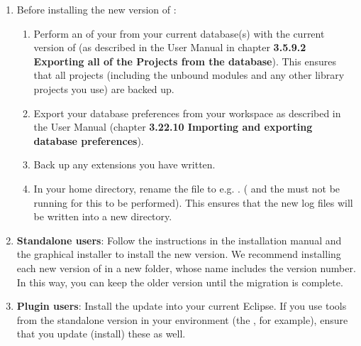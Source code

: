 \begin{enumerate}
\item Before installing the new version of \app{}:
\begin{enumerate}
\item Perform an  of your \gdprojects{} from your current database(s) with the current version of \app{} (as described in the User Manual in chapter \textbf{3.5.9.2 Exporting all of the Projects from the database}). This ensures that all projects (including the unbound modules and any other library projects you use) are backed up.
\item Export your database preferences from your workspace as described in the User Manual (chapter \textbf{3.22.10 Importing and exporting database preferences}).
\item Back up any extensions you have written.
\item In your home directory, rename the  file to e.g. . (\app{} and the \gdagent{} must not be running for this to be performed). This ensures that the new log files will be written into a new  directory. 
\end{enumerate}
\item \textbf{Standalone users}: Follow the instructions in the installation manual and the graphical installer to install the new version. We recommend installing each new version of \app{} in a new folder, whose name includes the version number. In this way, you can keep the older version until the migration is complete. 
\item \textbf{Plugin users}: Install the update into your current Eclipse. If you use tools from the standalone version in your environment (the \gdagent{}, for example), ensure that you update (install) these as well. 
\end{enumerate}
